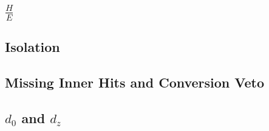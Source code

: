 \label{ssec:id2}
\subsection{$\frac{H}{E}$}
\label{ssec:id3}

\subsection{Isolation}
\label{ssec:id42}
\subsection{Missing Inner Hits and Conversion Veto}
\label{ssec:id5}
\subsection{$d_{0}$ and $d_{z}$}
\label{ssec:id6}

